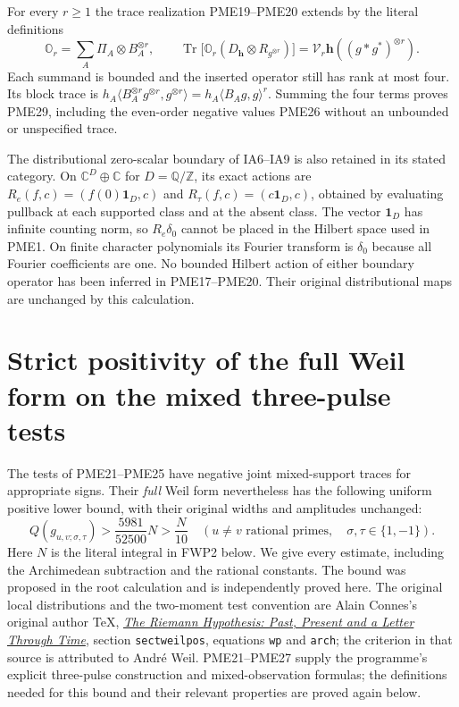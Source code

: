 \documentclass[11pt]{article}
\begin{document}
For every $r\ge1$ the trace realization PME19--PME20 extends by the
literal definitions
\[
 \mathbb O_r=\sum_A\Pi_A\otimes B_A^{\otimes r},\qquad
 \operatorname{Tr}\big[\mathbb O_r
 (D_{\mathbf h}\otimes R_{g^{\otimes r}})\big]
   =\mathcal V_r\mathbf h((g*g^*)^{\otimes r}).
 \tag{PME29}
\]
Each summand is bounded and the inserted operator still has rank at
most four. Its block trace is
$h_A\langle B_A^{\otimes r}g^{\otimes r},g^{\otimes r}\rangle
=h_A\langle B_Ag,g\rangle^r$.
Summing the four terms proves PME29, including the even-order
negative values PME26 without an unbounded or unspecified trace.

The distributional zero-scalar boundary of IA6--IA9 is also retained
in its stated category. On $\mathbb C^{D}\oplus\mathbb C$ for
$D=\mathbb Q/\mathbb Z$, its exact actions are
$R_e(f,c)=(f(0)\mathbf1_D,c)$ and
$R_\tau(f,c)=(c\mathbf1_D,c)$, obtained by evaluating pullback at
each supported class and at the absent class. The vector
$\mathbf1_D$ has infinite counting norm, so $R_e\delta_0$
cannot be placed in the Hilbert space used in PME1.
On finite character polynomials its Fourier transform is $\delta_0$
because all Fourier coefficients are one. No bounded Hilbert action
of either boundary operator has been inferred in PME17--PME20.
Their original distributional maps are unchanged by this calculation.


\section{Strict positivity of the full Weil form on the mixed three-pulse tests}
\label{sec:full-weil-three-pulse}

The tests of PME21--PME25 have negative joint mixed-support traces
for appropriate signs. Their \emph{full} Weil form nevertheless has
the following uniform positive lower bound, with their original
widths and amplitudes unchanged:
\[
 \boxed{Q(g_{u,v;\sigma,\tau})>
       \frac{5981}{52500}N>\frac{N}{10}}
 \quad
 \left(u\ne v\text{ rational primes},\quad
       \sigma,\tau\in\{1,-1\}\right).
 \tag{FWP1}
\]
Here $N$ is the literal integral in FWP2 below. We give every estimate,
including the Archimedean subtraction and the rational constants.
The bound was proposed in the root calculation and is independently
proved here. The original local distributions and the two-moment
test convention are Alain Connes's original author TeX,
\href{https://arxiv.org/abs/2602.04022v1}{\emph{The Riemann Hypothesis:
Past, Present and a Letter Through Time}}, section
\texttt{sectweilpos}, equations \texttt{wp} and \texttt{arch};
the criterion in that source is attributed to Andr\'e Weil.
PME21--PME27 supply the programme's explicit three-pulse construction
and mixed-observation formulas; the definitions needed for this bound
and their relevant properties are proved again below.
\end{document}
